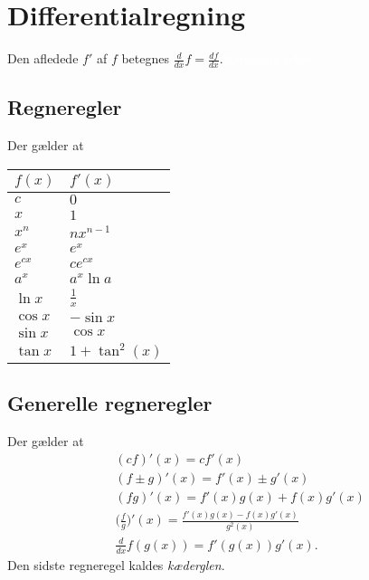 \section{Differentialregning}
Den afledede $f'$ af $f$ betegnes $\frac{d}{dx}f=\frac{df}{dx}$.
\textcolor{white}{hemmelig tekst}

\subsection{Regneregler}
Der gælder at
\begin{center}
		\begin{tabular}{@{}l l@{}}
		$f(x)$      & $f'(x)$  				\\ \toprule
		$c$			& $0$ 					\\ \midrule
		$x$			& $1$					\\ \midrule
		$x^n$  		& $nx^{n-1}$			\\ \midrule
		$e^x$  		& $e^x$					\\ \midrule
		$e^{cx}$  	& $ce^{cx}$				\\ \midrule
		$a^x$  		& $a^x\ln a $			\\ \midrule
		$\ln x$ 	& $\frac{1}{x}$			\\ \midrule
		$\cos x$  	& $-\sin x$				\\ \midrule
		$\sin x$  	& $\cos x$				\\ \midrule
		$\tan x$ 	& $1+\tan^2(x)$		\\ \bottomrule  
	\end{tabular}
\end{center}
\subsection{Generelle regneregler}
Der gælder at
\begin{align*}
&(cf)'(x)=cf'(x)\\
&(f\pm g)'(x)=f'(x)\pm g'(x)\\
&(fg)'(x)=f'(x)g(x)+f(x)g'(x)\\
&\Big(\frac{f}{g}\Big)'(x)=\frac{f'(x)g(x)-f(x)g'(x)}{g^2(x)}\\
&\frac{d}{dx}f(g(x))=f'(g(x))g'(x).
\end{align*}
Den sidste regneregel kaldes \emph{kæderglen}.